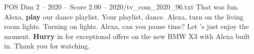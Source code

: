 \begin{textsample}{POS Dim 2 – 2020 – Score 2.00 – 2020/tv\_com\_2020\_96.txt}  \label{ex:f2_pos_072}
That was fun.
Alexa, \textbf{play} our dance playlist.
Your playlist, dance.
Alexa, turn on the living room lights.
Turning on lights.
Alexa, can you pause time?
Let 's just enjoy the moment. \textbf{Hurry} in for exceptional offers on the new BMW X3 with Alexa built in.
Thank you for watching.

\end{textsample}
